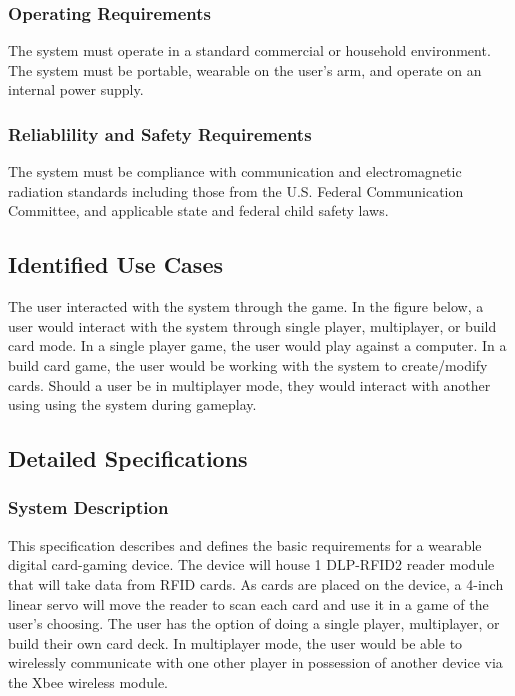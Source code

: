 \documentclass[12pt]{article} %
\begin{document}
\subsubsection{Operating Requirements}

The system must operate in a standard commercial or household environment. The system must be portable, wearable on the user's arm, and operate on an internal power supply.

\subsubsection{Reliablility and Safety Requirements}

The system must be compliance with communication and electromagnetic radiation
standards including those from the U.S. Federal Communication Committee, and
applicable state and federal child safety laws.

\subsection{Identified Use Cases}\label{sec:identifiedUseCases} %

The user interacted with the system through the game. In the figure below, a user would interact with the system through single player,
multiplayer, or build card mode. In a single player game, the user would play against a computer. In a build card game, the user would be working
with the system to create/modify cards. Should a user be in multiplayer mode, they would interact with another using using the system during gameplay.

\subsection{Detailed Specifications}\label{detailedSpec} %
\subsubsection{System Description}\label{designSystemSpec}

This specification describes and defines the basic requirements for a wearable digital card-gaming device. The device will house 1 DLP-RFID2 reader module that will take data from RFID cards. As cards are placed on the device, a 4-inch linear servo will move the reader to scan each card and use it in a game of the user’s choosing. The user has the option of doing a single player, multiplayer, or build their own card deck. In multiplayer mode, the user would be able to wirelessly communicate with one other player in possession of another device via the Xbee wireless module.
\end{document}
